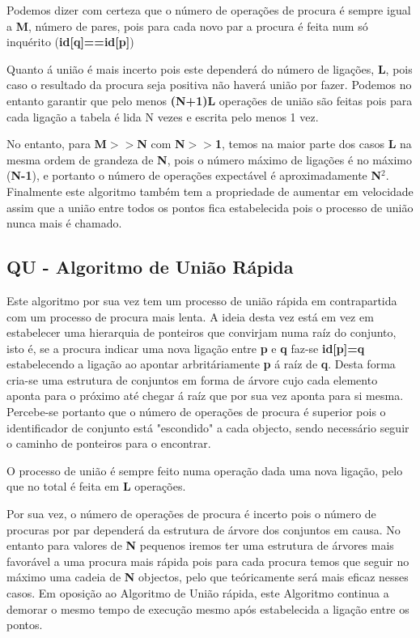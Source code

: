 \documentclass[10pt,a4paper]{article}
\begin{document}
\par Podemos dizer com certeza que o número de operações de procura é sempre igual a \textbf{M}, número de pares, pois para cada novo par a procura é feita num só inquérito (\textbf{id[q]==id[p]})
\par Quanto á união é mais incerto pois este dependerá do número de ligações, \textbf{L}, pois caso o resultado da procura seja positiva não haverá união por fazer. Podemos no entanto garantir que pelo menos \textbf{(N+1)L} operações de união são feitas pois para cada ligação a tabela é lida N vezes e escrita pelo menos 1 vez.
\par No entanto, para \textbf{M$>>$N} com \textbf{N$>>$1}, temos na maior parte dos casos \textbf{L} na mesma ordem de grandeza de \textbf{N}, pois o número máximo de ligações é no máximo (\textbf{N-1}), e portanto o número de operações expectável é aproximadamente \textbf{N}$^2$. Finalmente este algoritmo também tem a propriedade de aumentar em velocidade assim que a união entre todos os pontos fica estabelecida pois o processo de união nunca mais é chamado.

\subsection{QU - Algoritmo de União Rápida}
\par Este algoritmo por sua vez tem um processo de uni\~ao rápida em contrapartida com um processo de procura mais lenta. A ideia desta vez está em vez em estabelecer uma hierarquia de ponteiros que convirjam numa raíz do conjunto, isto é, se a procura indicar uma nova ligação entre \textbf{p} e \textbf{q} faz-se \textbf{id[p]=q} estabelecendo a ligação ao apontar arbritáriamente \textbf{p} á raíz de \textbf{q}. Desta forma cria-se uma estrutura de conjuntos em forma de árvore cujo cada elemento aponta para o próximo até chegar á raíz que por sua vez aponta para si mesma. Percebe-se portanto que o número de operações de procura é superior pois o identificador de conjunto está "escondido" a cada objecto, sendo necessário seguir o caminho de ponteiros para o encontrar.
\par O processo de união é sempre feito numa operação dada uma nova ligação, pelo que no total é feita em \textbf{L} operações.
\par Por sua vez, o número de operações de procura é incerto pois o número de procuras por par dependerá da estrutura de árvore dos conjuntos em causa. No entanto para valores de \textbf{N} pequenos iremos ter uma estrutura de árvores mais favorável a uma procura mais rápida pois para cada procura temos que seguir no máximo uma cadeia de \textbf{N} objectos, pelo que teóricamente será mais eficaz nesses casos. Em oposição ao Algoritmo de União rápida, este Algoritmo continua a demorar o mesmo tempo de execução mesmo após estabelecida a ligação entre os pontos.
\end{document}
